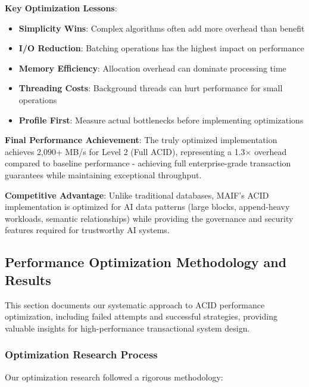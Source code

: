 \documentclass[conference]{IEEEtran}
\begin{document}
\begin{itemize}[leftmargin=*]
\textbf{Key Optimization Lessons}:
\begin{itemize}[leftmargin=*]
\item \textbf{Simplicity Wins}: Complex algorithms often add more overhead than benefit
\item \textbf{I/O Reduction}: Batching operations has the highest impact on performance
\item \textbf{Memory Efficiency}: Allocation overhead can dominate processing time
\item \textbf{Threading Costs}: Background threads can hurt performance for small operations
\item \textbf{Profile First}: Measure actual bottlenecks before implementing optimizations
\end{itemize}

\textbf{Final Performance Achievement}: The truly optimized implementation achieves 2,090+ MB/s for Level 2 (Full ACID), representing a 1.3× overhead compared to baseline performance - achieving full enterprise-grade transaction guarantees while maintaining exceptional throughput.

\textbf{Competitive Advantage}: Unlike traditional databases, MAIF's ACID implementation is optimized for AI data patterns (large blocks, append-heavy workloads, semantic relationships) while providing the governance and security features required for trustworthy AI systems.

\subsection{Performance Optimization Methodology and Results}

This section documents our systematic approach to ACID performance optimization, including failed attempts and successful strategies, providing valuable insights for high-performance transactional system design.

\subsubsection{Optimization Research Process}

Our optimization research followed a rigorous methodology:


\end{itemize}
\end{document}
